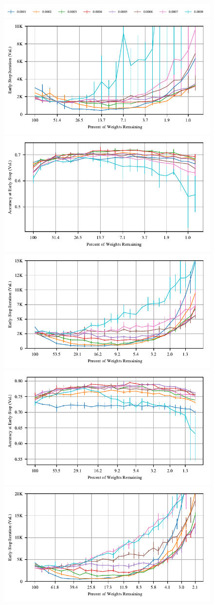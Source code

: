 \begin{figure}
\centering
\includegraphics[width=.8\textwidth]{graphs/cifar10/conv/adam_rate_sweep1/legend}
\includegraphics[width=.5\textwidth]{graphs/cifar10/conv/adam_rate_sweep1/iteration}%
\includegraphics[width=.5\textwidth]{graphs/cifar10/conv/adam_rate_sweep1/accuracy}
\includegraphics[width=.5\textwidth]{graphs/cifar10/conv/adam_rate_sweep2/iteration}%
\includegraphics[width=.5\textwidth]{graphs/cifar10/conv/adam_rate_sweep2/accuracy}
\includegraphics[width=.5\textwidth]{graphs/cifar10/conv/adam_rate_sweep3/iteration}%

\end{figure}
